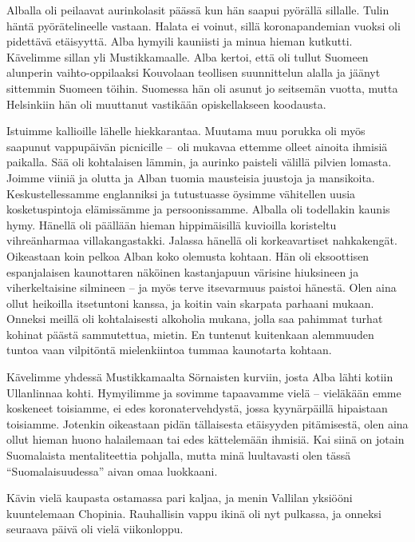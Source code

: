 \documentclass{tsnovel}
\begin{document}
Alballa oli peilaavat aurinkolasit päässä kun hän saapui pyörällä sillalle. Tulin häntä pyörätelineelle vastaan. Halata ei voinut, sillä koronapandemian vuoksi oli pidettävä etäisyyttä. Alba hymyili kauniisti ja minua hieman kutkutti. Kävelimme sillan yli Mustikkamaalle. Alba kertoi, että oli tullut Suomeen alunperin vaihto-oppilaaksi Kouvolaan teollisen suunnittelun alalla ja jäänyt sittemmin Suomeen töihin. Suomessa hän oli asunut jo seitsemän vuotta, mutta Helsinkiin hän oli muuttanut vastikään opiskellakseen koodausta.

Istuimme kallioille lähelle hiekkarantaa. Muutama muu porukka oli myös saapunut vappupäivän picnicille – oli mukavaa ettemme olleet ainoita ihmisiä paikalla. Sää oli kohtalaisen lämmin, ja aurinko paisteli välillä pilvien lomasta. Joimme viiniä ja olutta ja Alban tuomia mausteisia juustoja ja mansikoita. Keskustellessamme englanniksi ja tutustuasse öysimme vähitellen uusia kosketuspintoja elämissämme ja persoonissamme. Alballa oli todellakin kaunis hymy. Hänellä oli päällään hieman hippimäisillä kuvioilla koristeltu vihreänharmaa villakangastakki. Jalassa hänellä oli korkeavartiset nahkakengät. Oikeastaan koin  pelkoa Alban koko olemusta kohtaan. Hän oli eksoottisen espanjalaisen kaunottaren näköinen kastanjapuun värisine hiuksineen ja viherkeltaisine silmineen – ja myös terve itsevarmuus paistoi hänestä. Olen aina ollut heikoilla itsetuntoni kanssa, ja koitin vain skarpata parhaani mukaan. Onneksi meillä oli kohtalaisesti alkoholia mukana, jolla saa pahimmat turhat kohinat päästä sammutettua, mietin. En tuntenut kuitenkaan alemmuuden tuntoa vaan vilpitöntä mielenkiintoa tummaa kaunotarta kohtaan.

Kävelimme yhdessä Mustikkamaalta Sörnaisten kurviin, josta Alba lähti kotiin Ullanlinnaa kohti. Hymyilimme ja sovimme tapaavamme vielä – vieläkään emme koskeneet toisiamme, ei edes koronatervehdystä, jossa kyynärpäillä hipaistaan toisiamme. Jotenkin oikeastaan pidän tällaisesta etäisyyden pitämisestä, olen aina ollut hieman huono halailemaan tai edes kättelemään ihmisiä. Kai siinä on jotain Suomalaista mentaliteettia pohjalla, mutta minä luultavasti olen tässä ``Suomalaisuudessa'' aivan omaa luokkaani.

Kävin vielä kaupasta ostamassa pari kaljaa, ja menin Vallilan yksiööni kuuntelemaan Chopinia. Rauhallisin vappu ikinä oli nyt pulkassa, ja onneksi seuraava päivä oli vielä viikonloppu.
\end{document}
